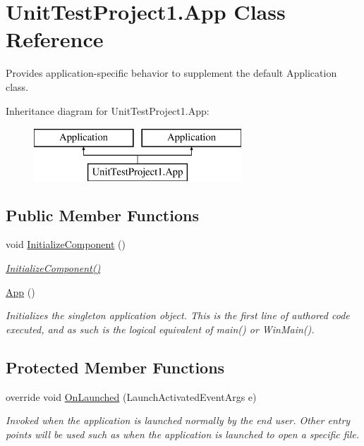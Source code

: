 \hypertarget{class_unit_test_project1_1_1_app}{}\section{Unit\+Test\+Project1.\+App Class Reference}
\label{class_unit_test_project1_1_1_app}


Provides application-\/specific behavior to supplement the default Application class.  


Inheritance diagram for Unit\+Test\+Project1.\+App\+:\begin{figure}[H]
\begin{center}
\leavevmode
\includegraphics[height=2.000000cm]{class_unit_test_project1_1_1_app}
\end{center}
\end{figure}
\subsection*{Public Member Functions}
\begin{DoxyCompactItemize}
\item 
void \mbox{\hyperlink{class_unit_test_project1_1_1_app_a1bc7aee65729fc4b0c80338cf4028b22}{Initialize\+Component}} ()
\begin{DoxyCompactList}\small\item\em \mbox{\hyperlink{class_unit_test_project1_1_1_app_a1bc7aee65729fc4b0c80338cf4028b22}{Initialize\+Component()}} \end{DoxyCompactList}\item 
\mbox{\hyperlink{class_unit_test_project1_1_1_app_a6856c24326e3e3cddf494d6e4b8b3a61}{App}} ()
\begin{DoxyCompactList}\small\item\em Initializes the singleton application object. This is the first line of authored code executed, and as such is the logical equivalent of main() or Win\+Main(). \end{DoxyCompactList}\end{DoxyCompactItemize}
\subsection*{Protected Member Functions}
\begin{DoxyCompactItemize}
\item 
override void \mbox{\hyperlink{class_unit_test_project1_1_1_app_a148cc1ef17ca10ba0f18ce3a202b74f3}{On\+Launched}} (Launch\+Activated\+Event\+Args e)
\begin{DoxyCompactList}\small\item\em Invoked when the application is launched normally by the end user. Other entry points will be used such as when the application is launched to open a specific file. \end{DoxyCompactList}\end{DoxyCompactItemize}


